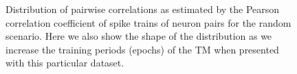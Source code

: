 \documentclass[11pt,letterpaper]{article}
\begin{document}
\begin{figure}[t]
{	    			\label{fig6:c}
		    	}
			    \caption{
			        Distribution of pairwise correlations as estimated by the Pearson
			        correlation coefficient of spike trains of neuron pairs for the random
			        scenario.
			        Here we also show the shape of the distribution as we increase the training periods (epochs)
			        of the TM when presented with this particular dataset.
			    }
			    \label{fig6}
		    \end{figure} 
\end{document}

